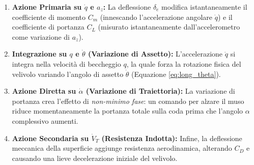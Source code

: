 \begin{enumerate}
	\item \textbf{Azione Primaria su $\dot{q}$ e $a_z$:} 
	La deflessione $\delta_e$ modifica istantaneamente il coefficiente di momento $C_m$ (innescando l'accelerazione angolare $\dot{q}$) e il coefficiente di portanza $C_L$ (misurato istantaneamente dall'accelerometro come variazione di $a_z$).
	\item \textbf{Integrazione su $q$ e $\dot{\theta}$ (Variazione di Assetto):} 
	L'accelerazione $\dot{q}$ si integra nella velocità di beccheggio $q$, la quale forza la rotazione fisica del velivolo variando l'angolo di assetto $\dot{\theta}$ (Equazione \ref{eq:long_theta}).
	\item \textbf{Azione Diretta su $\dot{\alpha}$ (Variazione di Traiettoria):} 
	La variazione di portanza crea l'effetto di \textit{non-minimo fase}: un comando per alzare il muso riduce momentaneamente la portanza totale sulla coda prima che l'angolo $\alpha$ complessivo aumenti.
	\item \textbf{Azione Secondaria su $\dot{V}_T$ (Resistenza Indotta):} 
	Infine, la deflessione meccanica della superficie aggiunge resistenza aerodinamica, alterando $C_D$ e causando una lieve decelerazione iniziale del velivolo.
\end{enumerate}



